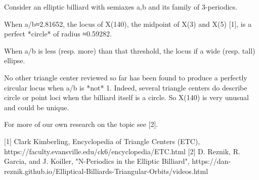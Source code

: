 Consider an elliptic billiard with semiaxes a,b and its family of 3-periodics. 

When a/b≈2.81652, the locus of X(140), the midpoint of X(3) and X(5) [1], is a perfect *circle* of radius ≈0.59282.

When a/b is less (resp. more) than that threshold, the locus if a wide (resp. tall) ellipse. 

No other triangle center reviewed so far has been found to produce a perfectly circular locus when a/b is *not* 1. Indeed, several triangle centers do describe circle or point loci when the billiard itself is a circle. So X(140) is very unusual and could be unique.

For more of our own research on the topic see [2].

[1] Clark Kimberling, Encyclopedia of Triangle Centers (ETC), https://faculty.evansville.edu/ck6/encyclopedia/ETC.html
[2] D. Reznik, R. Garcia, and J. Koiller, "N-Periodics in the Elliptic Billiard", https://dan-reznik.github.io/Elliptical-Billiards-Triangular-Orbits/videos.html